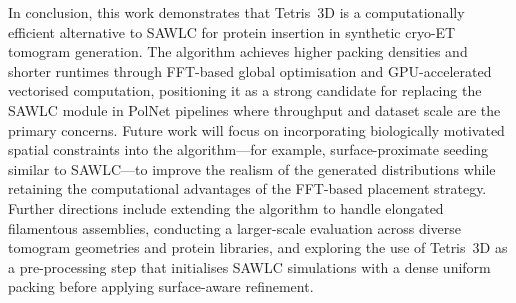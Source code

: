 In conclusion, this work demonstrates that Tetris~3D is a computationally efficient alternative
to SAWLC for protein insertion in synthetic cryo-ET tomogram generation. The algorithm achieves
higher packing densities and shorter runtimes through FFT-based global optimisation and
GPU-accelerated vectorised computation, positioning it as a strong candidate for replacing the
SAWLC module in PolNet pipelines where throughput and dataset scale are the primary concerns.
Future work will focus on incorporating biologically motivated spatial constraints into the
algorithm—for example, surface-proximate seeding similar to SAWLC—to improve the realism of
the generated distributions while retaining the computational advantages of the FFT-based
placement strategy. Further directions include extending the algorithm to handle elongated
filamentous assemblies, conducting a larger-scale evaluation across diverse tomogram geometries
and protein libraries, and exploring the use of Tetris~3D as a pre-processing step that
initialises SAWLC simulations with a dense uniform packing before applying surface-aware
refinement.

